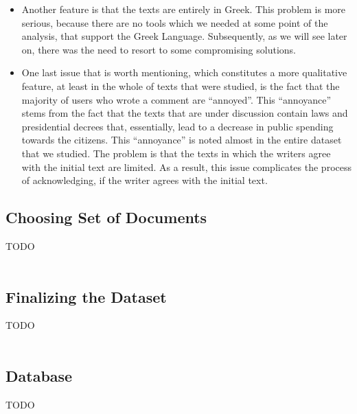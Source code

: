 \begin{itemize}
  \item Another feature is that the texts are entirely in Greek. This problem is more 	serious, because there are no tools which we needed at some point of the analysis, that support the Greek Language. Subsequently, as we will see later on, there was the need to resort to some compromising solutions.\\
  
  \item One last issue that is worth mentioning, which constitutes a more qualitative feature, at least in the whole of texts that were studied, is the fact that the majority of users who wrote a comment are ``annoyed''. This ``annoyance'' stems from the fact that the texts that are under discussion contain laws and presidential decrees that, essentially, lead to a decrease in public spending towards the citizens. This ``annoyance'' is noted almost in the entire dataset that we studied. The problem is that the texts in which the writers agree with the initial text are limited. As a result, this issue complicates the process of acknowledging, if the writer agrees with the initial text.
\end{itemize}


\subsection{Choosing Set of Documents}\label{312_ref}
TODO\\
\\
\subsection{Finalizing the Dataset}\label{313_ref}
TODO\\
\\
\subsection{Database}\label{314_ref}
TODO\\
\\

